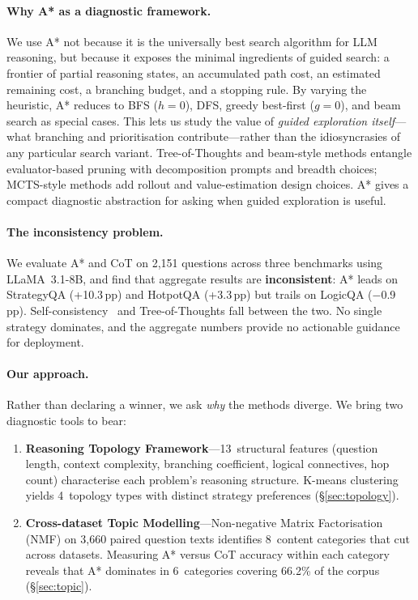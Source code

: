 \documentclass{article}
\newcommand{\pp}{\,pp\xspace}
\begin{document}
\paragraph{Why A* as a diagnostic framework.}
We use A* not because it is the universally best search algorithm for LLM
reasoning, but because it exposes the minimal ingredients of guided search: a
frontier of partial reasoning states, an accumulated path cost, an estimated
remaining cost, a branching budget, and a stopping rule.  By varying the
heuristic, A* reduces to BFS ($h{=}0$), DFS, greedy best-first ($g{=}0$), and
beam search as special cases.  This lets us study the value of
\emph{guided exploration itself}---what branching and prioritisation
contribute---rather than the idiosyncrasies of any particular search variant.
Tree-of-Thoughts and beam-style methods entangle evaluator-based pruning with
decomposition prompts and breadth choices; MCTS-style methods add rollout and
value-estimation design choices.  A* gives a compact diagnostic abstraction for
asking when guided exploration is useful.

\paragraph{The inconsistency problem.}
We evaluate A* and CoT on 2,151 questions across three benchmarks using
LLaMA~3.1-8B, and find that aggregate results are \textbf{inconsistent}: A*
leads on StrategyQA (+10.3\pp) and HotpotQA (+3.3\pp) but trails on
LogicQA ($-$0.9\pp).  Self-consistency~\citep{wang2023self} and
Tree-of-Thoughts fall between the two.  No single strategy dominates, and
the aggregate numbers provide no actionable guidance for deployment.

\paragraph{Our approach.}
Rather than declaring a winner, we ask \emph{why} the methods diverge.  We
bring two diagnostic tools to bear:

\begin{enumerate}[leftmargin=1.5em,itemsep=2pt]
\item \textbf{Reasoning Topology Framework}---13~structural features
(question length, context complexity, branching coefficient, logical
connectives, hop count) characterise each problem's reasoning structure.
K-means clustering yields 4~topology types with distinct strategy preferences
(\S\ref{sec:topology}).

\item \textbf{Cross-dataset Topic Modelling}---Non-negative Matrix
Factorisation (NMF) on 3,660 paired question texts identifies 8~content
categories that cut across datasets.  Measuring A* versus CoT accuracy within
each category reveals that A* dominates in 6~categories covering 66.2\% of
the corpus (\S\ref{sec:topic}).
\end{enumerate}
\end{document}
